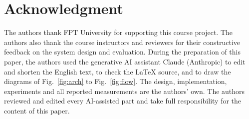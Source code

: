 \section*{Acknowledgment}

The authors thank FPT University for supporting this course project. The authors also thank the course instructors and
reviewers for their constructive feedback on the system design and evaluation. During the preparation of this paper,
the authors used the generative AI assistant Claude (Anthropic) to edit and shorten the English text, to check the
\LaTeX{} source, and to draw the diagrams of Fig.~\ref{fig:arch} to Fig.~\ref{fig:flow}. The design, implementation, experiments and all reported measurements are the authors' own.
The authors reviewed and edited every AI-assisted part and take full responsibility for the content of this paper.





